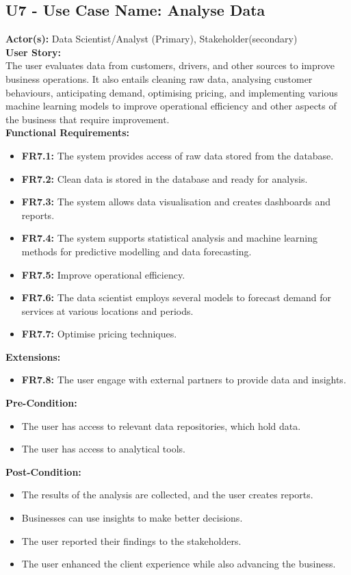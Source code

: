 \documentclass[9pt]{report}
\begin{document}
\subsection*{U7 - Use Case Name:  Analyse Data}
\textbf{Actor(s):} Data Scientist/Analyst (Primary), Stakeholder(secondary)
\textbf{\\User Story:} \\The user evaluates data from customers, drivers, and other sources to improve business operations. It also entails cleaning raw data, analysing customer behaviours, anticipating demand, optimising pricing, and implementing various machine learning models to improve operational efficiency and other aspects of the business that require improvement.
\textbf{\\Functional Requirements:}
\begin{itemize}
    \item \textbf{FR7.1:} The system provides access of raw data stored from the database.
    \item \textbf{FR7.2:} Clean data is stored in the database and ready for analysis.
    \item \textbf{FR7.3:} The system allows data visualisation and creates dashboards and reports.
    \item \textbf{FR7.4:} The system supports statistical analysis and machine learning methods for predictive modelling and data forecasting.
    \item \textbf{FR7.5:} Improve operational efficiency.
    \item \textbf{FR7.6:} The data scientist employs several models to forecast demand for services at various locations and periods.
    \item \textbf{FR7.7:} Optimise pricing techniques.
\end{itemize}
\textbf{Extensions:}
\begin{itemize}
    \item \textbf{FR7.8:} The user engage with external partners to provide data and insights.
\end{itemize}
\textbf{Pre-Condition:} 
\begin{itemize}
    \item The user has access to relevant data repositories, which hold data.
    \item The user has access to analytical tools.
\end{itemize}
\textbf{Post-Condition:} 
\begin{itemize}
    \item The results of the analysis are collected, and the user creates reports.
    \item Businesses can use insights to make better decisions.
    \item The user reported their findings to the stakeholders.
    \item The user enhanced the client experience while also advancing the business.
\end{itemize}
\end{document}
